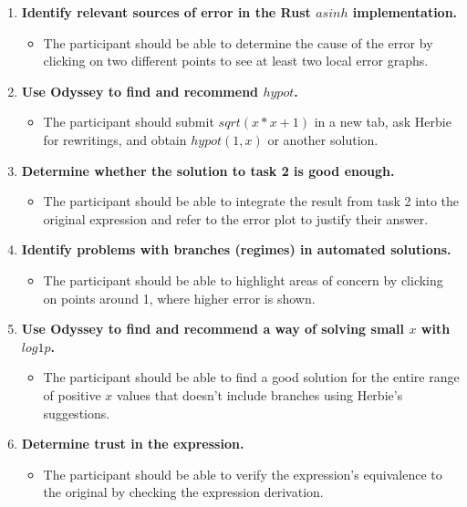 \begin{enumerate}
    \item \textbf{Identify relevant sources of error in the Rust $asinh$ implementation.}
        \begin{itemize}
        \item The participant should be able to determine the cause of the error by clicking on two different points to see at least two local error graphs.
        \end{itemize}
        
    \item \textbf{Use Odyssey to find and recommend $hypot$.}
        \begin{itemize}
        \item The participant should submit $sqrt(x * x + 1)$ in a new tab, ask Herbie for rewritings, and obtain $hypot(1, x)$ or another solution.
        \end{itemize}
        
    \item \textbf{Determine whether the solution to task 2 is good enough.}
        \begin{itemize}
        \item The participant should be able to integrate the result from task 2 into the original expression and refer to the error plot to justify their answer.
        \end{itemize}
        
    \item \textbf{Identify problems with branches (regimes) in automated solutions.}
        \begin{itemize}
        \item The participant should be able to highlight areas of concern by clicking on points around 1, where higher error is shown.
        \end{itemize}
        
    \item \textbf{Use Odyssey to find and recommend a way of solving small $x$ with $log1p$.}
        \begin{itemize}
        \item The participant should be able to find a good solution for the entire range of positive $x$ values that doesn’t include branches using Herbie's suggestions.
        \end{itemize}
        
    \item \textbf{Determine trust in the expression.}
        \begin{itemize}
        \item The participant should be able to verify the expression's equivalence to the original by checking the expression derivation.
        \end{itemize}
        

\end{enumerate}

